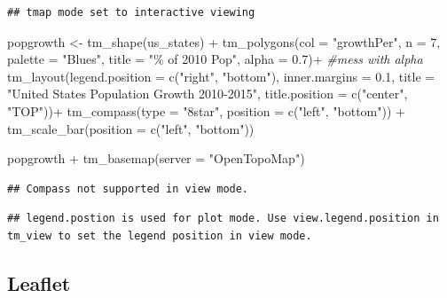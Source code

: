 \documentclass[
]{book}
\newenvironment{Shaded}{\begin{snugshade}}{\end{snugshade}}
\newcommand{\AttributeTok}[1]{\textcolor[rgb]{0.77,0.63,0.00}{#1}}
\newcommand{\CommentTok}[1]{\textcolor[rgb]{0.56,0.35,0.01}{\textit{#1}}}
\newcommand{\DecValTok}[1]{\textcolor[rgb]{0.00,0.00,0.81}{#1}}
\newcommand{\FloatTok}[1]{\textcolor[rgb]{0.00,0.00,0.81}{#1}}
\newcommand{\FunctionTok}[1]{\textcolor[rgb]{0.00,0.00,0.00}{#1}}
\newcommand{\NormalTok}[1]{#1}
\newcommand{\OtherTok}[1]{\textcolor[rgb]{0.56,0.35,0.01}{#1}}
\newcommand{\SpecialCharTok}[1]{\textcolor[rgb]{0.00,0.00,0.00}{#1}}
\newcommand{\StringTok}[1]{\textcolor[rgb]{0.31,0.60,0.02}{#1}}
\begin{document}
\begin{verbatim}
## tmap mode set to interactive viewing
\end{verbatim}

\begin{Shaded}
\begin{Highlighting}[]
\NormalTok{popgrowth }\OtherTok{\textless{}{-}} \FunctionTok{tm\_shape}\NormalTok{(us\_states) }\SpecialCharTok{+} 
  \FunctionTok{tm\_polygons}\NormalTok{(}\AttributeTok{col =} \StringTok{"growthPer"}\NormalTok{, }\AttributeTok{n =} \DecValTok{7}\NormalTok{, }
              \AttributeTok{palette =} \StringTok{"Blues"}\NormalTok{, }\AttributeTok{title =} \StringTok{"\% of 2010 Pop"}\NormalTok{,}
              \AttributeTok{alpha =} \FloatTok{0.7}\NormalTok{)}\SpecialCharTok{+} \CommentTok{\#mess with alpha}
  \FunctionTok{tm\_layout}\NormalTok{(}\AttributeTok{legend.position =} \FunctionTok{c}\NormalTok{(}\StringTok{"right"}\NormalTok{, }\StringTok{"bottom"}\NormalTok{), }
            \AttributeTok{inner.margins =} \FloatTok{0.1}\NormalTok{,}
            \AttributeTok{title =} \StringTok{"United States Population Growth 2010{-}2015"}\NormalTok{, }
            \AttributeTok{title.position =} \FunctionTok{c}\NormalTok{(}\StringTok{"center"}\NormalTok{, }\StringTok{"TOP"}\NormalTok{))}\SpecialCharTok{+}
  \FunctionTok{tm\_compass}\NormalTok{(}\AttributeTok{type =} \StringTok{"8star"}\NormalTok{, }\AttributeTok{position =} \FunctionTok{c}\NormalTok{(}\StringTok{"left"}\NormalTok{, }\StringTok{"bottom"}\NormalTok{)) }\SpecialCharTok{+}
  \FunctionTok{tm\_scale\_bar}\NormalTok{(}\AttributeTok{position =} \FunctionTok{c}\NormalTok{(}\StringTok{"left"}\NormalTok{, }\StringTok{"bottom"}\NormalTok{))}

\NormalTok{popgrowth }\SpecialCharTok{+} \FunctionTok{tm\_basemap}\NormalTok{(}\AttributeTok{server =} \StringTok{"OpenTopoMap"}\NormalTok{)}
\end{Highlighting}
\end{Shaded}

\begin{verbatim}
## Compass not supported in view mode.
\end{verbatim}

\begin{verbatim}
## legend.postion is used for plot mode. Use view.legend.position in tm_view to set the legend position in view mode.
\end{verbatim}

\hypertarget{leaflet}{%
\subsection{Leaflet}\label{leaflet}}
\end{document}
